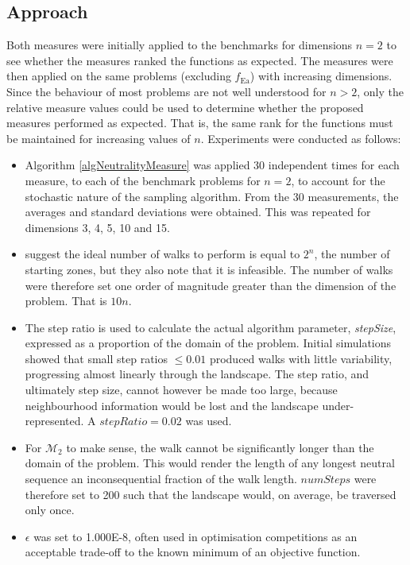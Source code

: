 \documentclass[conference]{IEEEtran}
\begin{document}
\subsection{Approach}
\label{visualApproach}
Both measures were initially applied to the benchmarks for dimensions $n=2$ to see whether the measures ranked the functions as expected. The measures were then applied on the same problems (excluding $f_{\text{Ea}}$) with increasing dimensions. Since the behaviour of most problems are not well understood for $n>2$, only the relative measure values could be used to determine whether the proposed measures performed as expected. That is, the same rank for the functions must be maintained for increasing values of $n$. Experiments were conducted as follows:

\begin{itemize}
	\item Algorithm \ref{algNeutralityMeasure} was applied 30 independent times for each measure, to each of the benchmark problems for $n=2$, to account for the stochastic nature of the sampling algorithm. From the 30 measurements, the averages and standard deviations were obtained. This was repeated for dimensions 3, 4, 5, 10 and 15.
	\item \citet{malan2014progressive} suggest the ideal number of walks to perform is equal to $2^n$, the number of starting zones, but they also note that it is infeasible. The number of walks were therefore set one order of magnitude greater than the dimension of the problem. That is $10n$.
	\item The step ratio is used to calculate the actual algorithm parameter, \textit{stepSize}, expressed as a proportion of the domain of the problem. Initial simulations showed that small step ratios $\le 0.01$ produced walks with little variability, progressing almost linearly through the landscape. The step ratio, and ultimately step size, cannot however be made too large, because neighbourhood information would be lost and the landscape under-represented. A $\textit{stepRatio} = 0.02$ was used.
	\item For $\mathcal{M}_2$ to make sense, the walk cannot be significantly longer than the domain of the problem. This would render the length of any longest neutral sequence an inconsequential fraction of the walk length. $numSteps$ were therefore set to 200 such that the landscape would, on average, be traversed only once.
	\item $\epsilon$ was set to 1.000E-8, often used in optimisation competitions as an acceptable trade-off to the known minimum of an objective function.
\end{itemize}
\end{document}
